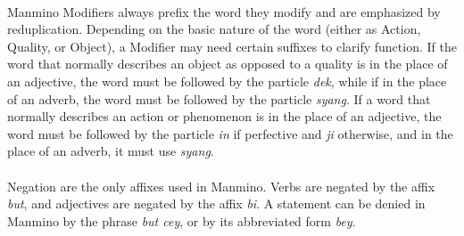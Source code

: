 \documentclass{book}
\begin{document}
            \paragraph{}
            Manmino Modifiers always prefix the word they modify and are emphasized by reduplication. Depending on the basic nature of the word (either as Action, Quality, or Object), a Modifier may need certain suffixes to clarify function. If the word that normally describes an object as opposed to a quality is in the place of an adjective, the word must be followed by the particle \textit{dek}, while if in the place of an adverb, the word must be followed by the particle \textit{syang}. If a word that normally describes an action or phenomenon is in the place of an adjective, the word must be followed by the particle \textit{in} if perfective and \textit{ji} otherwise, and in the place of an adverb, it must use \textit{syang}. 
            \paragraph{}
            Negation are the only affixes used in Manmino. Verbs are negated by the affix \textit{but}, and adjectives are negated by the affix \textit{bi}. A statement can be denied in Manmino by the phrase \textit{but cey}, or by its abbreviated form \textit{bey}. 
\end{document}
